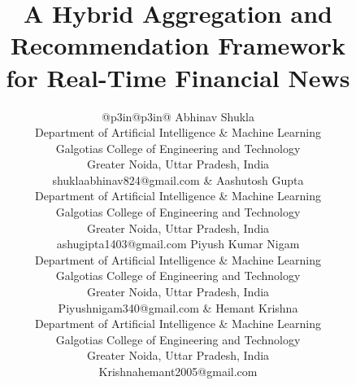 \documentclass[conference]{IEEEtran}
\begin{document}
\title{A Hybrid Aggregation and Recommendation Framework\\
for Real-Time Financial News}

\author{%
\begin{tabular}[t]{@{}p{3in}@{\hskip 0.5in}p{3in}@{}}
\centering
Abhinav Shukla\\[3pt]
{\small Department of Artificial Intelligence \& Machine Learning \\
Galgotias College of Engineering and Technology\\
Greater Noida, Uttar Pradesh, India\\
shuklaabhinav824@gmail.com}
&
\centering
Aashutosh Gupta\\[3pt]
{\small Department of Artificial Intelligence \& Machine Learning \\
Galgotias College of Engineering and Technology\\
Greater Noida, Uttar Pradesh, India\\
ashugipta1403@gmail.com}
\tabularnewline[6em]
\centering
Piyush Kumar Nigam\\[3pt]
{\small Department of Artificial Intelligence \& Machine Learning \\
Galgotias College of Engineering and Technology\\
Greater Noida, Uttar Pradesh, India\\
Piyushnigam340@gmail.com}
&
\centering
Hemant Krishna\\[3pt]
{\small Department of Artificial Intelligence \& Machine Learning \\
Galgotias College of Engineering and Technology\\
Greater Noida, Uttar Pradesh, India\\
Krishnahemant2005@gmail.com}
\tabularnewline[4em]
\end{tabular}
}

\maketitle
\end{document}
